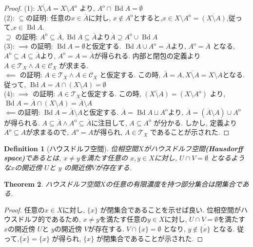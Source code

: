 \documentclass[dvipdfmx]{jbook}
\newcommand{\cl}[1]{\overline{ #1}  }
\newcommand{\Int}[1]{#1 ^{\mathrm{o}} }
\newcommand{\bd}[1]{\operatorname{Bd}{#1}}
\newtheorem{theorem}{Theorem}[section]
\newtheorem{definition}[theorem]{Definition}
\theoremstyle{remark}
\theoremstyle{plain}
\begin{document}
\begin{proof}
	(1): $\cl{X\setminus A}= X\setminus \Int{ A }$ より, $\Int{A} \cap \bd{A}= \emptyset$\\
	(2): $\subseteq$の証明: 任意の$x \in \cl{A}$に対し,  $x \not\in \Int{A}$とすると,$ x \in X \setminus \Int{A} = \cl{\left( X \setminus A \right) }$,従って,$x \in \bd{A}.$\\
	$\supseteq$ の証明: $\Int{A} \subseteq \cl{A}, \bd{A} \subseteq \cl{A}$より$\cl{A} \supseteq \Int{A} \cup \bd{A}$ \\
	(3): $\implies$の証明: $\bd{A} = \emptyset$と仮定する. $\bd{A} \cup \Int{A} = \cl{A} $より,  $\Int{A} = \cl{A}$ となる, $\Int{A} \subseteq A \subseteq \cl{A}$より, $\Int{A} =A = \cl{A}$が得られる. 内部と閉包の定義より $A \in \mathcal{T}_X \land A \in \mathcal{C}_X$ が求まる.\\
	$\impliedby$ の証明: $A \in \mathcal{T}_X \land A \in \mathcal{C}_X$ と仮定する. この時, $\cl{A} = A, \cl{X\setminus A } = X \setminus A$となる.
	従って, $\bd{A} = A \cap \left( X \setminus A \right) = \emptyset$ \\
	(4): $\implies$ の証明: $A \in \mathcal{T}_X $と仮定する. この時, $\cl{\left( X \setminus A \right) } = \left( X \setminus \Int A \right)  $ より, $\bd{A} = \cl{A} \cap \left( X \setminus A \right) = \cl{A} \setminus A$ \\
	$\impliedby$の証明: $\bd{A} = \cl{A} \setminus A$と仮定する. 
	$\cl{A} = \bd{A} \sqcup \Int{A}$より, $\cl{A} = \left( \cl{A} \setminus A  \right) \cup \Int{A}$ が得られる. 
	$A \subseteq \cl{A} \land \Int{A} \subseteq \cl{A}$に注目して,  $ A \subseteq  \Int{A} $ が分かる. 
	しかし, 定義より$\Int{A} \subseteq A$が求まるので,  $\Int{A} = A$が得られ,  $A \in \mathcal{T}_X$ であることが示された.
	
\end{proof}


\begin{definition}[ハウスドルフ空間]
	位相空間$X$がハウスドルフ空間\textbf{(Hausdorff space)}であるとは, $x\neq y$を満たす任意の $x,y \in X$に対し,  $U \cap V = \emptyset $ となるような$x$の開近傍 $U$と $y$ の開近傍$V$が存在する.
\end{definition}

\begin{theorem}
	ハウスドルフ空間$X$の任意の有限濃度を持つ部分集合は閉集合である.
\end{theorem}

\begin{proof}
	任意の$x \in X$に対し,  $\{x\} $ が閉集合であることを示せば良い.
	位相空間がハウスドルフ的であるため, $x \neq y$を満たす任意の$y \in X$に対し,  $U \cap V =\emptyset$を満たす $x$の開近傍 $U$と $y$の開近傍 $V$が存在する.
	$V \cap \{x\} = \emptyset $ となり, $y \not\in \cl{\{x\} } $ となる. 
	従って,$\cl{\{x\} } = \{x\}  $ が得られ, $\{x\} $ が閉集合であることが示された.
\end{proof}
\end{document}
